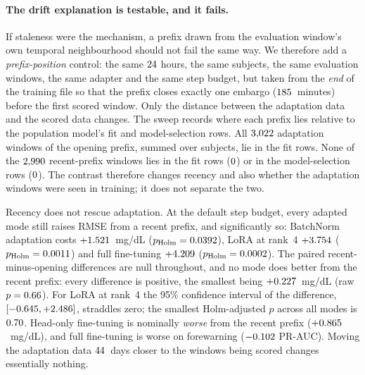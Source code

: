 \paragraph{The drift explanation is testable, and it fails.} If staleness were
the mechanism, a prefix drawn from the evaluation window's own temporal
neighbourhood should not fail the same way. We therefore add a
\emph{prefix-position} control: the same $24$ hours, the same
subjects, the same evaluation windows, the same adapter and the same step
budget, but taken from the \emph{end} of the training file so that the prefix
closes exactly one embargo ($185$~minutes) before the first
scored window. Only the distance between the adaptation data and the scored data
changes. The sweep records where each prefix lies relative to the population
model's fit and model-selection rows. All $3{,}022$ adaptation
windows of the opening prefix, summed over subjects, lie in the fit rows. None of
the $2{,}990$ recent-prefix windows lies in the fit rows
($0$) or in the model-selection rows
($0$). The contrast therefore changes recency and also
whether the adaptation windows were seen in training; it does not separate the two.



Recency does not rescue adaptation. At the default step budget, every adapted
mode still raises RMSE from a recent prefix, and significantly so: BatchNorm adaptation costs
$+1.521$~mg/dL ($p_{\text{Holm}} =
0.0392$), LoRA at rank~4 $+3.754$
($p_{\text{Holm}} = 0.0011$) and full fine-tuning
$+4.209$ ($p_{\text{Holm}} = 0.0002$). The
paired recent-minus-opening differences are null throughout, and no mode does
better from the recent prefix: every difference is positive, the smallest being
$+0.227$~mg/dL (raw $p = 0.66$). For LoRA at rank~4 the
95\% confidence interval of the difference,
$[-0.645, +2.486]$, straddles zero;
the smallest Holm-adjusted $p$ across all modes is $0.70$. Head-only
fine-tuning is nominally \emph{worse} from the recent prefix
($+0.865$~mg/dL), and full fine-tuning is worse on forewarning
($-0.102$ PR-AUC). Moving the adaptation data
$44$~days closer to the windows being scored changes
essentially nothing.

